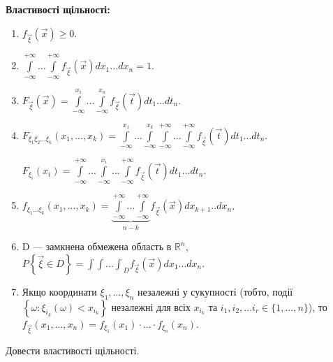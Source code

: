 \noindent \textbf{Властивості щільності:}
\begin{enumerate}
    \item $f_{\vec{\xi}}(\vec{x}) \geq 0$.
    \item $\int\limits_{-\infty}^{+\infty}...\int\limits_{-\infty}^{+\infty}
    f_{\vec{\xi}} (\vec{x})dx_1...dx_n = 1$.
    \item $F_{\vec{\xi}}(\vec{x}) = 
    \int\limits_{-\infty}^{x_1}...\int\limits_{-\infty}^{x_n}
    f_{\vec{\xi}} (\vec{t})dt_1...dt_n$.
    \item $F_{\xi_1\xi_2...\xi_k}(x_1, ..., x_k) = 
    \int\limits_{-\infty}^{x_1}...\int\limits_{-\infty}^{x_k}
    \int\limits_{-\infty}^{+\infty}...\int\limits_{-\infty}^{+\infty}
    f_{\vec{\xi}} (\vec{t})dt_1...dt_n$.

    $F_{\xi_i}(x_i) = \int\limits_{-\infty}^{+\infty}...
    \int\limits_{-\infty}^{x_i}...\int\limits_{-\infty}^{+\infty}
    f_{\vec{\xi}} (\vec{t})dt_1...dt_n$.

    \item $f_{\xi_1...\xi_k}(x_1, ..., x_k) = 
    \underbrace{
        \int\limits_{-\infty}^{+\infty} 
        ... 
        \int\limits_{-\infty}^{+\infty}
    }_{n-k} f_{\vec{\xi}}(\vec{x}) dx_{k+1}..dx_n$.
    \item D --- замкнена обмежена область в $\mathbb{R}^n$,
    $P\left\{\vec{\xi} \in D\right\} = {\int\int...\int}_D f_{\vec{\xi}}(\vec{x})
    dx_1 ... dx_n$.
    \item Якщо координати $\xi_1, ..., \xi_n$ незалежні у сукупності (тобто, події
    $\left\{\omega : \xi_{i_k}(\omega) < x_{i_k} \right\}$ незалежні для всіх $x_{i_k}$ та 
    $i_1, i_2, ... i_r \in \{1,...,n\}$), то 
    $f_{\vec{\xi}} (x_1, ..., x_n) = f_{\xi_1}(x_1) \cdot ... \cdot f_{\xi_n}(x_n)$.
\end{enumerate}
\begin{exercise}
    Довести властивості щільності.
\end{exercise}